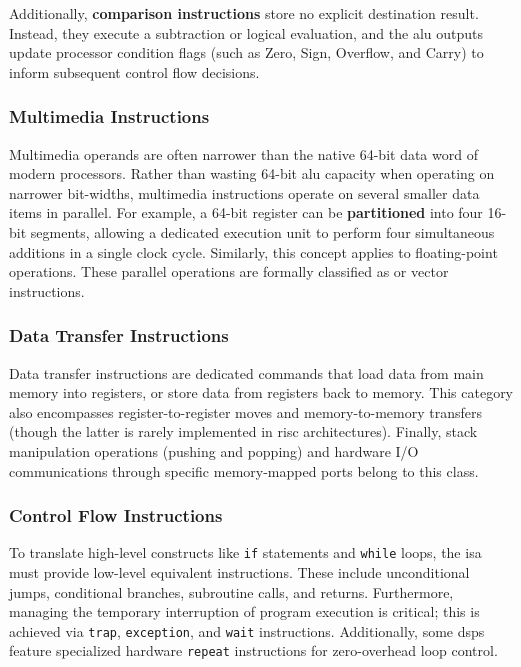 \noindent Additionally, \textbf{comparison instructions} store no explicit destination result. Instead, they execute a subtraction or logical evaluation, and the \gls{alu} outputs update processor condition flags (such as Zero, Sign, Overflow, and Carry) to inform subsequent control flow decisions.

\subsubsection{Multimedia Instructions}
Multimedia operands are often narrower than the native 64-bit data word of modern processors. Rather than wasting 64-bit \gls{alu} capacity when operating on narrower bit-widths, multimedia instructions operate on several smaller data items in parallel. For example, a 64-bit register can be \textbf{partitioned} into four 16-bit segments, allowing a dedicated execution unit to perform four simultaneous additions in a single clock cycle. Similarly, this concept applies to floating-point operations. These parallel operations are formally classified as  or vector instructions.

\subsubsection{Data Transfer Instructions} 
Data transfer instructions are dedicated commands that load data from main memory into registers, or store data from registers back to memory. This category also encompasses register-to-register moves and memory-to-memory transfers (though the latter is rarely implemented in \gls{risc} architectures). Finally, stack manipulation operations (pushing and popping) and hardware I/O communications through specific memory-mapped ports belong to this class.

\subsubsection{Control Flow Instructions}
To translate high-level constructs like \texttt{if} statements and \texttt{while} loops, the \gls{isa} must provide low-level equivalent instructions. These include unconditional jumps, conditional branches, subroutine calls, and returns. Furthermore, managing the temporary interruption of program execution is critical; this is achieved via \texttt{trap}, \texttt{exception}, and \texttt{wait} instructions. Additionally, some \glspl{dsp} feature specialized hardware \texttt{repeat} instructions for zero-overhead loop control.

